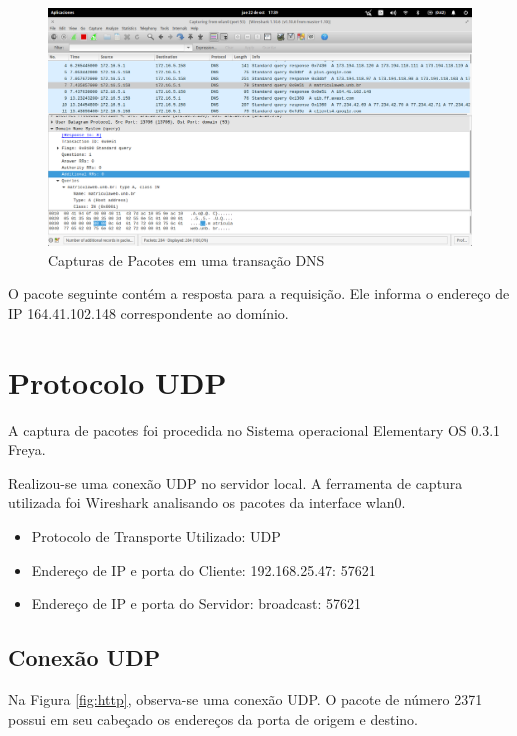   \begin{figure}[h]
    \centering

    \includegraphics[width=450px, scale=1]{figuras/dns}
    \caption{Capturas de Pacotes em uma transação DNS}

 \label{fig:dns}
  \end{figure}

O pacote seguinte contém a resposta para a requisição. Ele informa o endereço de IP 164.41.102.148 correspondente ao domínio.

\section{Protocolo UDP}

A captura de pacotes foi procedida no Sistema operacional Elementary OS 0.3.1 Freya.

Realizou-se uma conexão UDP no servidor local. A ferramenta de captura utilizada foi Wireshark analisando os pacotes da interface wlan0.

\begin{itemize}

    \item Protocolo de Transporte Utilizado: UDP

    \item Endereço de IP e porta do Cliente: 192.168.25.47: 57621 

    \item Endereço de IP e porta do Servidor: broadcast: 57621

\end{itemize}



\subsection{Conexão UDP}
Na Figura \ref{fig:http}, observa-se uma conexão UDP. O pacote  de número 2371  possui em seu cabeçado os endereços da porta de origem e destino.

